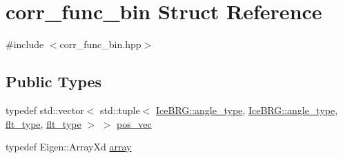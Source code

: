 \hypertarget{structcorr__func__bin}{}\section{corr\+\_\+func\+\_\+bin Struct Reference}
\label{structcorr__func__bin}


{\ttfamily \#include $<$corr\+\_\+func\+\_\+bin.\+hpp$>$}

\subsection*{Public Types}
\begin{DoxyCompactItemize}
\item 
typedef std\+::vector$<$ std\+::tuple$<$ \hyperlink{namespaceIceBRG_a688eeb0811a2474b20b667ed2e9625a1}{Ice\+B\+R\+G\+::angle\+\_\+type}, \hyperlink{namespaceIceBRG_a688eeb0811a2474b20b667ed2e9625a1}{Ice\+B\+R\+G\+::angle\+\_\+type}, \hyperlink{lib_2IceBRG__main_2common_8h_ad0f130a56eeb944d9ef2692ee881ecc4}{flt\+\_\+type}, \hyperlink{lib_2IceBRG__main_2common_8h_ad0f130a56eeb944d9ef2692ee881ecc4}{flt\+\_\+type} $>$ $>$ \hyperlink{structcorr__func__bin_a683c7075740b3dcae9ebb1ac758c0bfa}{pos\+\_\+vec}
\item 
typedef Eigen\+::\+Array\+Xd \hyperlink{structcorr__func__bin_a266e654606807bf423b915c6ef9ff7ab}{array}
\end{DoxyCompactItemize}
